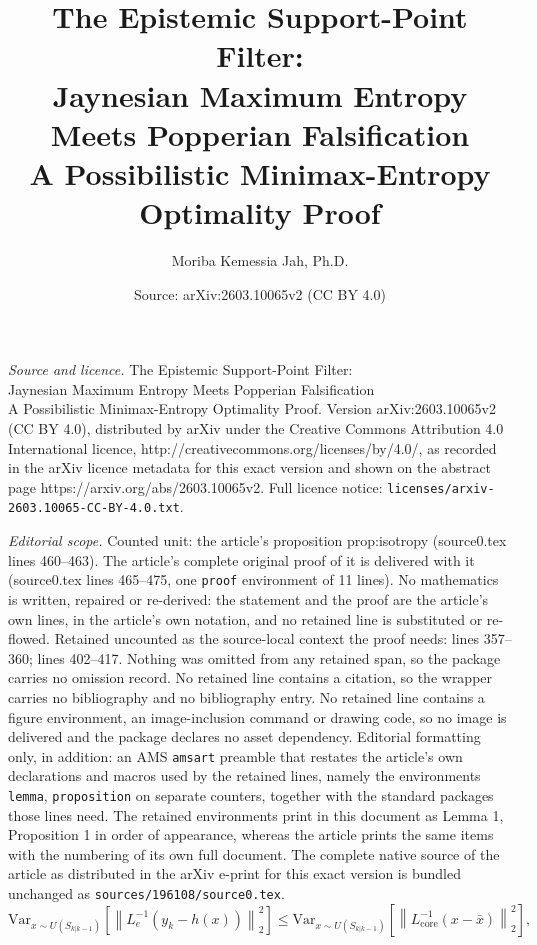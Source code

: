 \documentclass[10pt,a4paper]{amsart}
\title{The Epistemic Support-Point Filter:\\ Jaynesian Maximum Entropy Meets Popperian Falsification\\ \large A Possibilistic Minimax-Entropy Optimality Proof}
\author{Moriba Kemessia Jah, Ph.D.}
\date{Source: arXiv:2603.10065v2 (CC BY 4.0)}
\begin{document}
\maketitle

\noindent\emph{Source and licence.} The Epistemic Support-Point Filter:\\ Jaynesian Maximum Entropy Meets Popperian Falsification\\ \large A Possibilistic Minimax-Entropy Optimality Proof. Version arXiv:2603.10065v2 (CC BY 4.0), distributed by arXiv under the Creative Commons Attribution 4.0 International licence, http://creativecommons.org/licenses/by/4.0/, as recorded in the arXiv licence metadata for this exact version and shown on the abstract page https://arxiv.org/abs/2603.10065v2. Full licence notice: \texttt{licenses/arxiv-2603.10065-CC-BY-4.0.txt}.\par\smallskip

\noindent\textit{Editorial scope.} Counted unit: the article's proposition prop:isotropy (source0.tex lines 460--463). The article's complete original proof of it is delivered with it (source0.tex lines 465--475, one \texttt{proof} environment of 11 lines). No mathematics is written, repaired or re-derived: the statement and the proof are the article's own lines, in the article's own notation, and no retained line is substituted or re-flowed.  Retained uncounted as the source-local context the proof needs: lines 357--360; lines 402--417.  Nothing was omitted from any retained span, so the package carries no omission record.  No retained line contains a citation, so the wrapper carries no bibliography and no bibliography entry.  No retained line contains a figure environment, an image-inclusion command or drawing code, so no image is delivered and the package declares no asset dependency.  Editorial formatting only, in addition: an AMS \texttt{amsart} preamble that restates the article's own declarations and macros used by the retained lines, namely the environments \texttt{lemma}, \texttt{proposition} on separate counters, together with the standard packages those lines need.  The retained environments print in this document as Lemma 1, Proposition 1 in order of appearance, whereas the article prints the same items with the numbering of its own full document.  The complete native source of the article as distributed in the arXiv e-print for this exact version is bundled unchanged as \texttt{sources/196108/source0.tex}.
\begin{equation}
\label{eq:isotropy}
\mathrm{Var}_{x \sim U(S_{k|k-1})}\!\left[\left\|L_e^{-1}(y_k - h(x))\right\|_2^2\right] \leq \mathrm{Var}_{x \sim U(S_{k|k-1})}\!\left[\left\|L_{\mathrm{core}}^{-1}(x - \bar{x})\right\|_2^2\right],
\end{equation}
\end{document}
